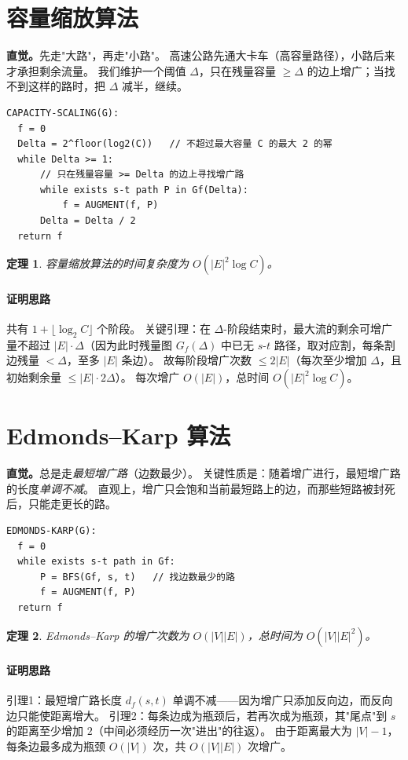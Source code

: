 \documentclass[UTF8,openany,12pt]{ctexbook}
\newtheorem{theorem}{定理}[chapter]
\theoremstyle{remark}
\newcommand{\proofidea}[1]{\paragraph{证明思路}#1}
\begin{document}
\section{容量缩放算法}

\noindent\textbf{直觉。}先走"大路"，再走"小路"。
高速公路先通大卡车（高容量路径），小路后来才承担剩余流量。
我们维护一个阈值 $\Delta$，只在残量容量 $\ge\Delta$ 的边上增广；当找不到这样的路时，把 $\Delta$ 减半，继续。

\begin{lstlisting}
CAPACITY-SCALING(G):
  f = 0
  Delta = 2^floor(log2(C))   // 不超过最大容量 C 的最大 2 的幂
  while Delta >= 1:
      // 只在残量容量 >= Delta 的边上寻找增广路
      while exists s-t path P in Gf(Delta):
          f = AUGMENT(f, P)
      Delta = Delta / 2
  return f
\end{lstlisting}

\begin{theorem}
容量缩放算法的时间复杂度为 $O(|E|^2\log C)$。
\end{theorem}
\proofidea{
共有 $1+\lfloor\log_2 C\rfloor$ 个阶段。
关键引理：在 $\Delta$-阶段结束时，最大流的剩余可增广量不超过 $|E|\cdot\Delta$（因为此时残量图 $G_f(\Delta)$ 中已无 $s$-$t$ 路径，取对应割，每条割边残量 $<\Delta$，至多 $|E|$ 条边）。
故每阶段增广次数 $\le 2|E|$（每次至少增加 $\Delta$，且初始剩余量 $\le|E|\cdot 2\Delta$）。
每次增广 $O(|E|)$，总时间 $O(|E|^2\log C)$。
}

\section{Edmonds--Karp 算法}

\noindent\textbf{直觉。}总是走\emph{最短增广路}（边数最少）。
关键性质是：随着增广进行，最短增广路的长度\emph{单调不减}。
直观上，增广只会饱和当前最短路上的边，而那些短路被封死后，只能走更长的路。

\begin{lstlisting}
EDMONDS-KARP(G):
  f = 0
  while exists s-t path in Gf:
      P = BFS(Gf, s, t)   // 找边数最少的路
      f = AUGMENT(f, P)
  return f
\end{lstlisting}

\begin{theorem}
Edmonds--Karp 的增广次数为 $O(|V||E|)$，总时间为 $O(|V||E|^2)$。
\end{theorem}
\proofidea{
引理1：最短增广路长度 $d_f(s,t)$ 单调不减——因为增广只添加反向边，而反向边只能使距离增大。
引理2：每条边成为瓶颈后，若再次成为瓶颈，其"尾点"到 $s$ 的距离至少增加 $2$（中间必须经历一次"进出"的往返）。
由于距离最大为 $|V|-1$，每条边最多成为瓶颈 $O(|V|)$ 次，共 $O(|V||E|)$ 次增广。
}
\end{document}
